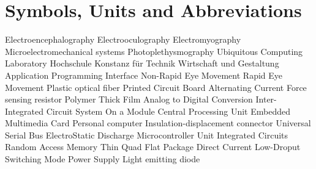 \chapter*{Symbols, Units and Abbreviations}

\begin{acronym}
   {Electroencephalography}
   {Electrooculography}
   {Electromyography}
   {Microelectromechanical systems}
   {Photoplethysmography}
   {Ubiquitous Computing Laboratory}
   {Hochschule Konstanz f\"ur Technik Wirtschaft und Gestaltung}
   {Application Programming Interface}
   {Non-Rapid Eye Movement}
   {Rapid Eye Movement}
   {Plastic optical fiber}
   {Printed Circuit Board}
   {Alternating Current}
   {Force sensing resistor}
   {Polymer Thick Film}
   {Analog to Digital Conversion}
   {Inter-Integrated Circuit}
   {System On a Module}
   {Central Processing Unit}
   {Embedded Multimedia Card}
   {Personal computer}
   {Insulation-displacement connector}
   {Universal Serial Bus}
   {ElectroStatic Discharge}
   {Microcontroller Unit}
   {Integrated Circuits}
   {Random Access Memory}
   {Thin Quad Flat Package}
   {Direct Current}
   {Low-Droput}
   {Switching Mode Power Supply}
   {Light emitting diode}
\end{acronym}

\newpage